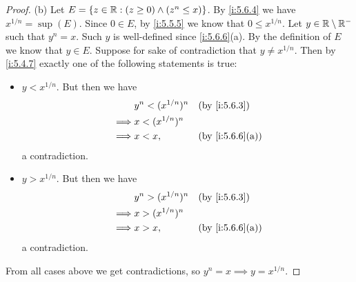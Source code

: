 \begin{proof}{(b)}
  Let \(E = \left\lbrace z \in \mathbb{R} : (z \geq 0) \land (z^n \leq x)\right\rbrace\).
  By \cref{i:5.6.4} we have \(x^{1 / n} = \sup(E)\).
  Since \(0 \in E\), by \cref{i:5.5.5} we know that \(0 \leq x^{1 / n}\).
  Let \(y \in \mathbb{R} \setminus \mathbb{R}^-\) such that \(y^n = x\).
  Such \(y\) is well-defined since \cref{i:5.6.6}(a).
  By the definition of \(E\) we know that \(y \in E\).
  Suppose for sake of contradiction that \(y \neq x^{1 / n}\).
  Then by \cref{i:5.4.7} exactly one of the following statements is true:
  \begin{itemize}
    \item \(y < x^{1 / n}\).
          But then we have
          \begin{align*}
                     & y^n < (x^{1 / n})^n &  & \by{i:5.6.3}    \\
            \implies & x < (x^{1 / n})^n                        \\
            \implies & x < x,              &  & \by{i:5.6.6}[a]
          \end{align*}
          a contradiction.
    \item \(y > x^{1 / n}\).
          But then we have
          \begin{align*}
                     & y^n > (x^{1 / n})^n &  & \by{i:5.6.3}    \\
            \implies & x > (x^{1 / n})^n                        \\
            \implies & x > x,              &  & \by{i:5.6.6}[a]
          \end{align*}
          a contradiction.
  \end{itemize}
  From all cases above we get contradictions, so \(y^n = x \implies y = x^{1 / n}\).
\end{proof}

